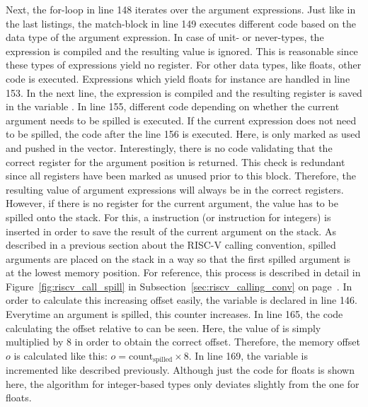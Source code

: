 Next, the for-loop in line 148 iterates over the argument expressions.
Just like in the last listings, the match-block in line 149 executes different code based on the data type of the argument expression.
In case of unit- or never-types, the expression is compiled and the resulting value is ignored.
This is reasonable since these types of expressions yield no register.
For other data types, like floats, other code is executed.
Expressions which yield floats for instance are handled in line 153.
In the next line, the expression is compiled and the resulting register is saved in the variable .
In line 155, different code depending on whether the current argument needs to be spilled is executed.
If the current expression does not need to be spilled, the code after the line 156 is executed.
Here,  is only marked as used and pushed in the  vector.
Interestingly, there is no code validating that the correct register for the argument position is returned.
This check is redundant since all registers have been marked as unused prior to this block.
Therefore, the resulting value of argument expressions will always be in the correct registers.
However, if there is no register for the current argument, the value has to be spilled onto the stack.
For this, a  instruction (or  instruction for integers) is inserted in order to save the result of the current argument on the stack.
As described in a previous section about the RISC-V calling convention, spilled arguments are placed on the stack in a way so that the first spilled argument is at the lowest memory position.
For reference, this process is described in detail in Figure~\ref{fig:riscv_call_spill} in Subsection~\ref{sec:riscv_calling_conv} on page~\pageref{sec:riscv_calling_conv}.
In order to calculate this increasing offset easily, the  variable is declared in line 146.
Everytime an argument is spilled, this counter increases.
In line 165, the code calculating the offset relative to  can be seen.
Here, the value of  is simply multiplied by 8 in order to obtain the correct offset.
Therefore, the memory offset $o$ is calculated like this: $o = \text{count}_\text{spilled} \times 8$.
In line 169, the  variable is incremented like described previously.
Although just the code for floats is shown here, the algorithm for integer-based types only deviates slightly from the one for floats.

